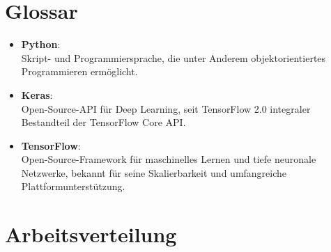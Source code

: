 
\nocite{*}						%
\cleardoublepage

\listoffigures
{}   %
\cleardoublepage

\listoftables
{}		%
\cleardoublepage

\lstlistoflistings
{}%
\cleardoublepage

\chapter*{Glossar}

\begin{itemize}
	\item \textbf{Python}:\\ Skript- und Programmiersprache, die unter Anderem objektorientiertes Programmieren ermöglicht. 
	\item \textbf{Keras}:\\ Open-Source-API für Deep Learning, seit TensorFlow 2.0 integraler Bestandteil der TensorFlow Core API.
	\item \textbf{TensorFlow}:\\  Open-Source-Framework für maschinelles Lernen und tiefe neuronale Netzwerke, bekannt für seine Skalierbarkeit und umfangreiche Plattformunterstützung.
\end{itemize} 

\chapter*{Arbeitsverteilung}

